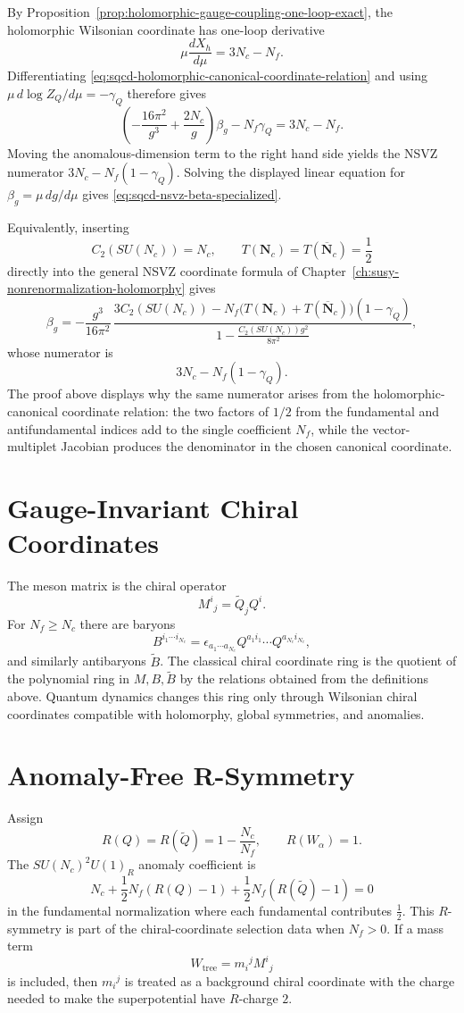 By Proposition~\ref{prop:holomorphic-gauge-coupling-one-loop-exact}, the
holomorphic Wilsonian coordinate has one-loop derivative
\[
  \mu\frac{dX_h}{d\mu}=3N_c-N_f .
\]
Differentiating \eqref{eq:sqcd-holomorphic-canonical-coordinate-relation}
and using \(\mu\,d\log Z_Q/d\mu=-\gamma_Q\) therefore gives
\[
  \left(
    -\frac{16\pi^2}{g^3}+\frac{2N_c}{g}
  \right)\beta_g
  -N_f\gamma_Q
  =
  3N_c-N_f .
\]
Moving the anomalous-dimension term to the right hand side yields the
NSVZ numerator \(3N_c-N_f(1-\gamma_Q)\).  Solving the displayed linear
equation for \(\beta_g=\mu\,dg/d\mu\) gives
\eqref{eq:sqcd-nsvz-beta-specialized}.

Equivalently, inserting
\[
  C_2(SU(N_c))=N_c,\qquad
  T(\mathbf N_c)=T(\overline{\mathbf N}_c)=\frac12
\]
directly into the general NSVZ coordinate formula of
Chapter~\ref{ch:susy-nonrenormalization-holomorphy} gives
\[
  \beta_g
  =
  -\frac{g^3}{16\pi^2}\,
  \frac{
    3C_2(SU(N_c))
    -
    N_f\bigl(T(\mathbf N_c)+T(\overline{\mathbf N}_c)\bigr)
    (1-\gamma_Q)
  }{
    1-\frac{C_2(SU(N_c))g^2}{8\pi^2}
  },
\]
whose numerator is
\[
  3N_c-N_f(1-\gamma_Q).
\]
The proof above displays why the same numerator arises from the
holomorphic-canonical coordinate relation: the two factors of \(1/2\) from
the fundamental and antifundamental indices add to the single coefficient
\(N_f\), while the vector-multiplet Jacobian produces the denominator in the
chosen canonical coordinate.

\section{Gauge-Invariant Chiral Coordinates}

The meson matrix is the chiral operator
\[
  M^i{}_j=\widetilde Q_j Q^i .
\]
For \(N_f\geq N_c\) there are baryons
\[
  B^{i_1\cdots i_{N_c}}
  =
  \epsilon_{a_1\cdots a_{N_c}}
  Q^{a_1 i_1}\cdots Q^{a_{N_c}i_{N_c}},
\]
and similarly antibaryons \(\widetilde B\).  The classical chiral coordinate
ring is the quotient of the polynomial ring in \(M,B,\widetilde B\) by the
relations obtained from the definitions above.  Quantum dynamics changes this
ring only through Wilsonian chiral coordinates compatible with holomorphy,
global symmetries, and anomalies.

\section{Anomaly-Free R-Symmetry}

Assign
\[
  R(Q)=R(\widetilde Q)=1-\frac{N_c}{N_f},
  \qquad
  R(W_\alpha)=1 .
\]
The \(SU(N_c)^2U(1)_R\) anomaly coefficient is
\[
  N_c+\frac12N_f(R(Q)-1)+\frac12N_f(R(\widetilde Q)-1)=0
\]
in the fundamental normalization where each fundamental contributes
\(\frac12\).  This \(R\)-symmetry is part of the chiral-coordinate selection
data when \(N_f>0\).  If a mass term
\[
  W_{\mathrm{tree}}=m_i{}^jM^i{}_j
\]
is included, then \(m_i{}^j\) is treated as a background chiral coordinate
with the charge needed to make the superpotential have \(R\)-charge \(2\).

